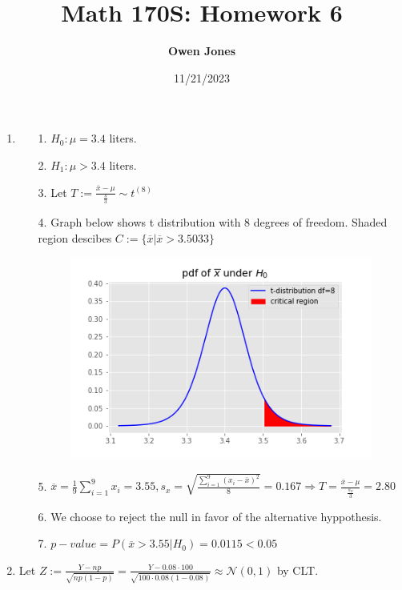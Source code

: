 \documentclass[10pt]{article}
\title{\bf Math 170S\@: Homework 6}
\date{11/21/2023}
\author{\bf Owen Jones}
\begin{document}
\maketitle
\begin{enumerate}[label=\textbf{Problem \arabic*.}]
    \item \begin{itemize}
        \item [1.] $H_0:\mu=3.4$ liters.
        \item [2.] $H_1:\mu>3.4$ liters.
        \item [3.] Let $T:=\frac{\overline{x}-\mu}{\frac{s}{3}}\sim t^{(8)}$
        \item [4.] Graph below shows t distribution with $8$ degrees of freedom. Shaded region descibes $C:=\{\overline{x}|\overline{x}>3.5033\}$
        \begin{figure}[H]
            \includegraphics[scale=0.5]{170S_hw_6_Q_1.png}
        \end{figure}
        \item [5.] $\displaystyle\overline{x}=\frac{1}{9}\sum_{i=1}^{9}x_i=3.55,s_x=\sqrt{\frac{\displaystyle\sum_{i=1}^{9}{(x_i-\overline{x})}^2}{8}}=0.167\Rightarrow T=\frac{\overline{x}-\mu}{\frac{s_x}{3}}=2.80$
        \item [6.] We choose to reject the null in favor of the alternative hyppothesis.
        \item [7.] $p-value=P(\overline{x}>3.55|H_0)=0.0115<0.05$
    \end{itemize}
    \item Let $Z:=\frac{Y-np}{\sqrt{np(1-p)}}=\frac{Y-0.08\cdot 100}{\sqrt{100\cdot 0.08(1-0.08)}}\approx\mathcal{N}(0,1)$ by CLT.\\

\end{enumerate}
\end{document}
